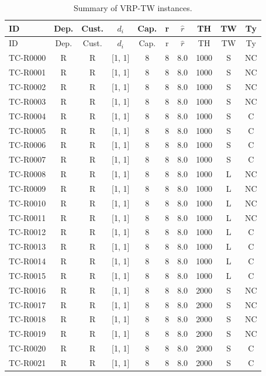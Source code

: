 \begin{longtable}{lccccccccc}
\caption{Summary of VRP-TW instances.} \\
\toprule
ID & Dep. & Cust. & $d_i$ & Cap. & r & $\hat{r}$ & TH & TW & Ty \\
\midrule
\endfirsthead
\toprule
ID & Dep. & Cust. & $d_i$ & Cap. & r & $\hat{r}$ & TH & TW & Ty \\
\midrule
\endhead
\bottomrule
\endfoot
\bottomrule
\endlastfoot
TC-R0000 & R & R & [1, 1] & 8 & 8 & 8.0 & 1000 & S & NC \\
TC-R0001 & R & R & [1, 1] & 8 & 8 & 8.0 & 1000 & S & NC \\
TC-R0002 & R & R & [1, 1] & 8 & 8 & 8.0 & 1000 & S & NC \\
TC-R0003 & R & R & [1, 1] & 8 & 8 & 8.0 & 1000 & S & NC \\
TC-R0004 & R & R & [1, 1] & 8 & 8 & 8.0 & 1000 & S & C \\
TC-R0005 & R & R & [1, 1] & 8 & 8 & 8.0 & 1000 & S & C \\
TC-R0006 & R & R & [1, 1] & 8 & 8 & 8.0 & 1000 & S & C \\
TC-R0007 & R & R & [1, 1] & 8 & 8 & 8.0 & 1000 & S & C \\
TC-R0008 & R & R & [1, 1] & 8 & 8 & 8.0 & 1000 & L & NC \\
TC-R0009 & R & R & [1, 1] & 8 & 8 & 8.0 & 1000 & L & NC \\
TC-R0010 & R & R & [1, 1] & 8 & 8 & 8.0 & 1000 & L & NC \\
TC-R0011 & R & R & [1, 1] & 8 & 8 & 8.0 & 1000 & L & NC \\
TC-R0012 & R & R & [1, 1] & 8 & 8 & 8.0 & 1000 & L & C \\
TC-R0013 & R & R & [1, 1] & 8 & 8 & 8.0 & 1000 & L & C \\
TC-R0014 & R & R & [1, 1] & 8 & 8 & 8.0 & 1000 & L & C \\
TC-R0015 & R & R & [1, 1] & 8 & 8 & 8.0 & 1000 & L & C \\
TC-R0016 & R & R & [1, 1] & 8 & 8 & 8.0 & 2000 & S & NC \\
TC-R0017 & R & R & [1, 1] & 8 & 8 & 8.0 & 2000 & S & NC \\
TC-R0018 & R & R & [1, 1] & 8 & 8 & 8.0 & 2000 & S & NC \\
TC-R0019 & R & R & [1, 1] & 8 & 8 & 8.0 & 2000 & S & NC \\
TC-R0020 & R & R & [1, 1] & 8 & 8 & 8.0 & 2000 & S & C \\
TC-R0021 & R & R & [1, 1] & 8 & 8 & 8.0 & 2000 & S & C \\

\end{longtable}
